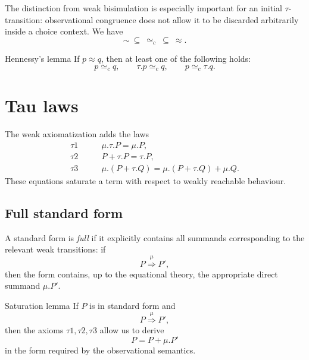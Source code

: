 \documentclass[a4paper]{article}
\newcommand{\wtrans}[1]{\mathrel{\overset{#1}{\Rightarrow}}}
\begin{document}
The distinction from weak bisimulation is especially important for an initial \(\tau\)-transition: observational congruence does not allow it to be discarded arbitrarily inside a choice context.
We have
\[
    \sim\ \subseteq\ \simeq_c\ \subseteq\ \approx.
\]

\begin{snippettheorem}{Hennessy's lemma}
    If \(p\approx q\), then at least one of the following holds:
    \[
        p\simeq_c q,
        \qquad
        \tau.p\simeq_c q,
        \qquad
        p\simeq_c\tau.q.
    \]
\end{snippettheorem}

\section{Tau laws}

The weak axiomatization adds the laws
\begin{align*}
    \tau1\qquad&\mu.\tau.P = \mu.P,\\
    \tau2\qquad&P+\tau.P = \tau.P,\\
    \tau3\qquad&\mu.(P+\tau.Q)
        =
        \mu.(P+\tau.Q)+\mu.Q.
\end{align*}
These equations saturate a term with respect to weakly reachable behaviour.

\subsection{Full standard form}

A standard form is \emph{full} if it explicitly contains all summands corresponding to the relevant weak transitions: if
\[
    P\wtrans{\mu}P',
\]
then the form contains, up to the equational theory, the appropriate direct summand \(\mu.P'\).

\begin{snippetproposition}{Saturation lemma}
    If \(P\) is in standard form and
    \[
        P\wtrans{\mu}P',
    \]
    then the axioms \(\tau1,\tau2,\tau3\) allow us to derive
    \[
        P=P+\mu.P'
    \]
    in the form required by the observational semantics.
\end{snippetproposition}
\end{document}

